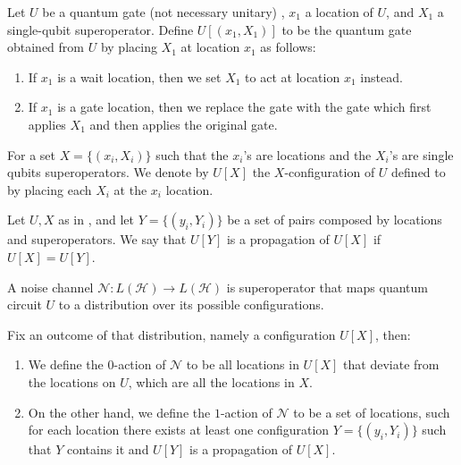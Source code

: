 \begin{definition}[$U$-configurations]
  \label{def:config}
  Let $U$ be a quantum gate (not necessary unitary) , $x_{1}$ a location of $U$, and $X_1$ a single-qubit superoperator. Define $U[(x_1,X_1)]$ to be the quantum gate obtained from $U$ by placing $X_1$ at location $x_1$ as follows: 
  \begin{enumerate}
    \item If $x_1$ is a wait location, then we set $X_1$ to act at location $x_1$ instead. 
    \item If $x_1$ is a gate location, then we replace the gate with the gate which first applies $X_1$ and then applies the original gate.  
  \end{enumerate}
  For a set $X = \{ (x_{i},X_{i}) \}$ such that the $x_{i}$'s are locations and the $X_{i}$'s are single qubits superoperators. We denote by  $U[X]$ the $X$-configuration of $U$ defined to by placing each $X_{i}$ at the $x_{i}$ location. 
\end{definition}

\begin{definition}[Propgation]
  Let $U, X$ as in , and let $Y=\{(y_{i},Y_i)\}$ be a set of pairs composed by locations and superoperators. We say that $U[Y]$ is a propagation of $U[X]$ if $U[X] = U[Y]$.  
\end{definition}


\begin{definition}
  A noise channel $\mathcal{N} : L(\mathcal{H}) \rightarrow L(\mathcal{H})$ is superoperator that maps quantum circuit $U$ to a distribution over its possible configurations.  

  Fix an outcome of that distribution, namely a configuration $U[X]$, then: 
  \begin{enumerate}
      \item We define the $0$-action of $\mathcal{N}$ to be all locations in $U[X]$ that deviate from the locations on $U$, which are all the locations in $X$.  
      \item On the other hand, we define the $1$-action of $\mathcal{N}$ to be a set of locations, such for each location there exists at least one configuration $Y = \{(y_{i},Y_{i})\}$ such that $Y$ contains it and $U[Y]$ is a propagation of $U[X]$.
  \end{enumerate}

\end{definition}

